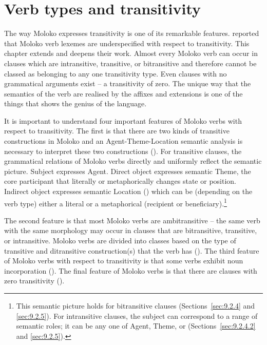\chapter[Verb types and transitivity]{Verb types and transitivity}\label{chap:9}
\hypertarget{RefHeading1212621525720847}{}
The way  Moloko expresses transitivity is one of its remarkable features. \citet{FriesenMamalis2008} reported that Moloko verb lexemes are underspecified with respect to transitivity.  This chapter extends and deepens their work. Almost every Moloko verb can occur in clauses which are intransitive, transitive, or bitransitive and therefore cannot be classed as belonging to any one transitivity type.  Even clauses with no grammatical arguments exist -- a transitivity of zero. The unique way that the semantics of the verb are realised by the affixes and extensions is one of the things that shows the genius of the language. 

It is important to understand four important features of Moloko verbs with respect to transitivity. The first is that there are two kinds of transitive constructions in Moloko and an Agent-Theme-Location semantic analysis is necessary to interpret these two constructions (). For transitive clauses, the grammatical relations of Moloko verbs directly and uniformly reflect the semantic picture. Subject expresses Agent. Direct object expresses semantic Theme, the core participant that literally or metaphorically changes state or position. Indirect object expresses semantic Location (\LOC) which can be  (depending on the verb type) either a literal or a metaphorical \LOC (recipient or beneficiary).\footnote{This semantic picture holds for bitransitive clauses (Sections~\ref{sec:9.2.4} and \ref{sec:9.2.5}). For intransitive clauses, the subject can correspond to a range of semantic roles; it can be any one of Agent, Theme, or \LOC (Sections~\ref{sec:9.2.4.2} and \ref{sec:9.2.5}).}

The second feature is that most Moloko verbs are ambitransitive -- the same verb with the same morphology may occur in clauses that are bitransitive, transitive, or intransitive. Moloko verbs are divided into classes based on the type of transitive and ditransitive construction(s) that the verb has ().  The third feature of Moloko verbs with respect to transitivity is that some verbs exhibit noun incorporation (). The final feature of Moloko verbs is that there are clauses with zero transitivity ().


